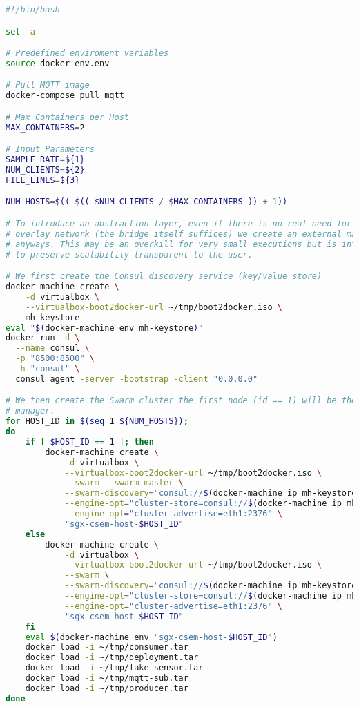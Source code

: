 \begin{lstlisting}[language=sh,caption={Client Cluster Deployment Script.},label=code:deploy-client]
#!/bin/bash

set -a

# Predefined enviroment variables
source docker-env.env

# Pull MQTT image
docker-compose pull mqtt

# Max Containers per Host
MAX_CONTAINERS=2

# Input Parameters
SAMPLE_RATE=${1}
NUM_CLIENTS=${2}
FILE_LINES=${3}

NUM_HOSTS=$(( $(( $NUM_CLIENTS / $MAX_CONTAINERS )) + 1))

# To introduce an abstraction layer, even if there is no real need for an
# overlay network (the bridge itself suffices) we create an external machine
# anyways. This may be an overkill for very small executions but is introduced
# to preserve scalability transparent to the user.

# We first create the Consul discovery service (key/value store)
docker-machine create \
    -d virtualbox \
    --virtualbox-boot2docker-url ~/tmp/boot2docker.iso \
    mh-keystore
eval "$(docker-machine env mh-keystore)"
docker run -d \
  --name consul \
  -p "8500:8500" \
  -h "consul" \
  consul agent -server -bootstrap -client "0.0.0.0"

# We then create the Swarm cluster the first node (id == 1) will be the swarm
# manager.
for HOST_ID in $(seq 1 ${NUM_HOSTS}); 
do
    if [ $HOST_ID == 1 ]; then
        docker-machine create \
            -d virtualbox \
            --virtualbox-boot2docker-url ~/tmp/boot2docker.iso \
            --swarm --swarm-master \
            --swarm-discovery="consul://$(docker-machine ip mh-keystore):8500" \
            --engine-opt="cluster-store=consul://$(docker-machine ip mh-keystore):8500" \
            --engine-opt="cluster-advertise=eth1:2376" \
            "sgx-csem-host-$HOST_ID"
    else
        docker-machine create \
            -d virtualbox \
            --virtualbox-boot2docker-url ~/tmp/boot2docker.iso \
            --swarm \
            --swarm-discovery="consul://$(docker-machine ip mh-keystore):8500" \
            --engine-opt="cluster-store=consul://$(docker-machine ip mh-keystore):8500" \
            --engine-opt="cluster-advertise=eth1:2376" \
            "sgx-csem-host-$HOST_ID"
    fi
    eval $(docker-machine env "sgx-csem-host-$HOST_ID")
    docker load -i ~/tmp/consumer.tar
    docker load -i ~/tmp/deployment.tar
    docker load -i ~/tmp/fake-sensor.tar
    docker load -i ~/tmp/mqtt-sub.tar
    docker load -i ~/tmp/producer.tar
done


\end{lstlisting}
